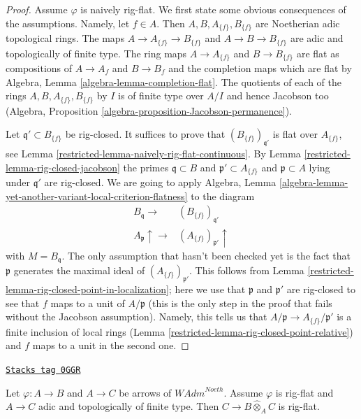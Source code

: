 \begin{proof}

Assume $\varphi$ is naively rig-flat. We first state some obvious
consequences of the assumptions. Namely, let $f \in A$.
Then $A, B, A_{\{f\}}, B_{\{f\}}$
are Noetherian adic topological rings. The maps
$A \to A_{\{f\}} \to B_{\{f\}}$ and $A \to B \to B_{\{f\}}$
are adic and topologically of finite type.
The ring maps $A \to A_{\{f\}}$ and $B \to B_{\{f\}}$
are flat as compositions of $A \to A_f$ and $B \to B_f$
and the completion maps which are flat by
Algebra, Lemma \ref{algebra-lemma-completion-flat}.
The quotients of each of the rings
$A, B, A_{\{f\}}, B_{\{f\}}$ by $I$ is of finite type
over $A/I$ and hence Jacobson too
(Algebra, Proposition \ref{algebra-proposition-Jacobson-permanence}).

\medskip\noindent
Let $\mathfrak q' \subset B_{\{f\}}$ be rig-closed.
It suffices to prove that $(B_{\{f\}})_{\mathfrak q'}$
is flat over $A_{\{f\}}$, see Lemma \ref{restricted-lemma-naively-rig-flat-continuous}.
By Lemma \ref{restricted-lemma-rig-closed-jacobson} the primes
$\mathfrak q \subset B$ and $\mathfrak p' \subset A_{\{f\}}$
and $\mathfrak p \subset A$ lying under $\mathfrak q'$ are rig-closed.
We are going to apply
Algebra, Lemma \ref{algebra-lemma-yet-another-variant-local-criterion-flatness}
to the diagram
$$
\begin{array}{cc}B_\mathfrak q \longrightarrow & (B_{\{f\}})_{\mathfrak q'} \\ A_\mathfrak p \uparrow\longrightarrow & (A_{\{f\}})_{\mathfrak p'} \uparrow\end{array}
$$
with $M = B_\mathfrak q$.
The only assumption that hasn't been checked yet is the fact
that $\mathfrak p$ generates the maximal ideal of
$(A_{\{f\}})_{\mathfrak p'}$. This follows from
Lemma \ref{restricted-lemma-rig-closed-point-in-localization};
here we use that $\mathfrak p$ and $\mathfrak p'$ are rig-closed
to see that $f$ maps to a unit of $A/\mathfrak p$
(this is the only step in the proof that fails without
the Jacobson assumption). Namely,
this tells us that $A/\mathfrak p \to A_{\{f\}}/\mathfrak p'$
is a finite inclusion of local rings
(Lemma \ref{restricted-lemma-rig-closed-point-relative})
and $f$ maps to a unit in the second one.
\end{proof}

\begin{lemma}
\label{restricted-lemma-rig-flat-base-change}
\href{https://stacks.math.columbia.edu/tag/0GGR}{\texttt{Stacks tag 0GGR}}

Let $\varphi : A \to B$ and $A \to C$ be arrows of $\textit{WAdm}^{Noeth}$.
Assume $\varphi$ is rig-flat and $A \to C$ adic and topologically
of finite type. Then $C \to B \widehat{\otimes}_A C$ is rig-flat.
\end{lemma}

